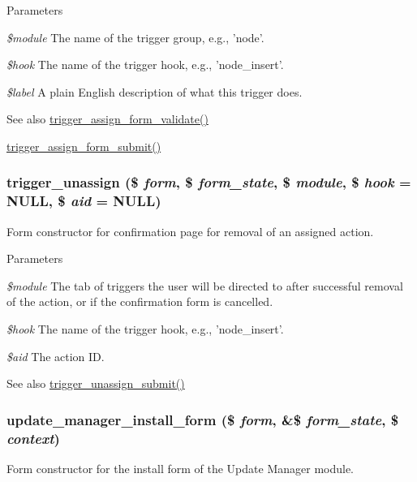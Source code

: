 \begin{DoxyParams}{Parameters}
\item[{\em \$module}]The name of the trigger group, e.g., 'node'. \item[{\em \$hook}]The name of the trigger hook, e.g., 'node\_\-insert'. \item[{\em \$label}]A plain English description of what this trigger does.\end{DoxyParams}
\begin{DoxySeeAlso}{See also}
\hyperlink{trigger_8admin_8inc_ab8f232934437a99af0903a397c090934}{trigger\_\-assign\_\-form\_\-validate()} 

\hyperlink{trigger_8admin_8inc_adbb964aba3db9ae31067feff7af230ab}{trigger\_\-assign\_\-form\_\-submit()} 
\end{DoxySeeAlso}
\hypertarget{group__forms_ga0ffa8d4daef7b89cd984be08c612856b}{
\subsubsection[{trigger\_\-unassign}]{\setlength{\rightskip}{0pt plus 5cm}trigger\_\-unassign (\$ {\em form}, \/  \$ {\em form\_\-state}, \/  \$ {\em module}, \/  \$ {\em hook} = {\ttfamily NULL}, \/  \$ {\em aid} = {\ttfamily NULL})}}
\label{group__forms_ga0ffa8d4daef7b89cd984be08c612856b}
Form constructor for confirmation page for removal of an assigned action.


\begin{DoxyParams}{Parameters}
\item[{\em \$module}]The tab of triggers the user will be directed to after successful removal of the action, or if the confirmation form is cancelled. \item[{\em \$hook}]The name of the trigger hook, e.g., 'node\_\-insert'. \item[{\em \$aid}]The action ID.\end{DoxyParams}
\begin{DoxySeeAlso}{See also}
\hyperlink{trigger_8admin_8inc_ae0e1a6cb2c032a6650a19c8d898896c0}{trigger\_\-unassign\_\-submit()} 
\end{DoxySeeAlso}
\hypertarget{group__forms_ga5905518e0d54228827271f90dcd8c5c3}{
\subsubsection[{update\_\-manager\_\-install\_\-form}]{\setlength{\rightskip}{0pt plus 5cm}update\_\-manager\_\-install\_\-form (\$ {\em form}, \/  \&\$ {\em form\_\-state}, \/  \$ {\em context})}}
\label{group__forms_ga5905518e0d54228827271f90dcd8c5c3}
Form constructor for the install form of the Update Manager module.

